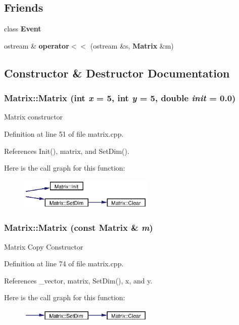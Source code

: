 \subsection*{Friends}
\begin{CompactItemize}
\item 
class {\bf Event}
\item 
ostream \& {\bf operator$<$$<$} (ostream \&s, {\bf Matrix} \&m)
\end{CompactItemize}


\subsection{Constructor \& Destructor Documentation}
\subsubsection{\setlength{\rightskip}{0pt plus 5cm}Matrix::Matrix (int {\em x} = 5, int {\em y} = 5, double {\em init} = 0.0)}\label{classMatrix_a0}


Matrix constructor 

Definition at line 51 of file matrix.cpp.

References Init(), matrix, and Set\-Dim().

Here is the call graph for this function:\begin{figure}[H]
\begin{center}
\leavevmode
\includegraphics[width=182pt]{classMatrix_a0_cgraph}
\end{center}
\end{figure}
\subsubsection{\setlength{\rightskip}{0pt plus 5cm}Matrix::Matrix (const {\bf Matrix} \& {\em m})}\label{classMatrix_a1}


Matrix Copy Constructor 

Definition at line 74 of file matrix.cpp.

References \_\-vector, matrix, Set\-Dim(), x, and y.

Here is the call graph for this function:\begin{figure}[H]
\begin{center}
\leavevmode
\includegraphics[width=182pt]{classMatrix_a1_cgraph}
\end{center}
\end{figure}
